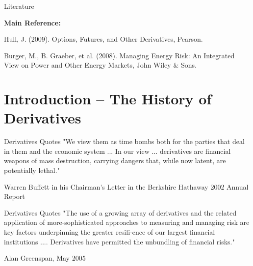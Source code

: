 
{}
\vspace{0cm}
\begin{center}
\end{center}

{Literature}


	\textbf{Main Reference:}


	Hull, J. (2009). Options, Futures, and Other Derivatives, Pearson.
%

	Burger, M., B. Graeber, et al. (2008). Managing Energy Risk: An Integrated View on Power and Other Energy Markets, John Wiley \& Sons.



\section{Introduction -- The History of Derivatives}

{}
\vspace{0cm}
\begin{center}
\end{center}

{Derivatives Quotes}
"We view them as time bombs both for the parties that deal in them and the economic system ... In our view ... derivatives are financial weapons of mass destruction, carrying dangers that, while now latent, are potentially lethal."
\begin{flushright}
  \begin{footnotesize}
  Warren Buffett in his Chairman's Letter in the Berkshire Hathaway 2002 Annual Report
 \end{footnotesize}
\end{flushright}

{Derivatives Quotes}
"The use of a growing array of derivatives and the related application of more-sophisticated approaches to measuring and managing risk are key factors underpinning the greater resili-ence of our largest financial institutions .... Derivatives have permitted the unbundling of financial risks."
\begin{flushright}
  \begin{footnotesize}
  Alan Greenspan, May 2005
 \end{footnotesize}
\end{flushright}

